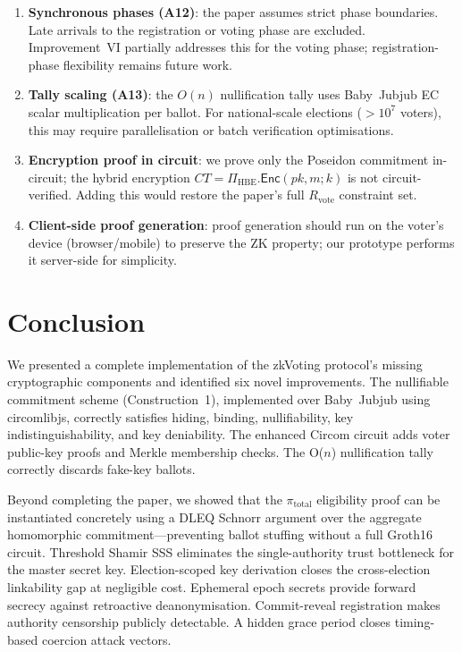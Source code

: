 \documentclass[conference]{IEEEtran}
\begin{document}
\begin{enumerate}
  \item \textbf{Synchronous phases (A12)}: the paper assumes strict phase
    boundaries.  Late arrivals to the registration or voting phase are
    excluded.  Improvement~VI partially addresses this for the voting phase;
    registration-phase flexibility remains future work.

  \item \textbf{Tally scaling (A13)}: the $O(n)$ nullification tally uses
    Baby~Jubjub EC scalar multiplication per ballot.  For national-scale
    elections ($> 10^7$ voters), this may require parallelisation or
    batch verification optimisations.

  \item \textbf{Encryption proof in circuit}: we prove only the Poseidon
    commitment in-circuit; the hybrid encryption $\mathit{CT} =
    \Pi_{\mathrm{HBE}}.\mathsf{Enc}(\mathit{pk}, m; k)$
    is not circuit-verified.  Adding this would restore the paper's full
    $R_{\text{vote}}$ constraint set.

  \item \textbf{Client-side proof generation}: proof generation should run
    on the voter's device (browser/mobile) to preserve the ZK property;
    our prototype performs it server-side for simplicity.
\end{enumerate}

\section{Conclusion}
\label{sec:conclusion}

We presented a complete implementation of the zkVoting protocol's missing
cryptographic components and identified six novel improvements.  The
nullifiable commitment scheme (Construction~1), implemented over Baby~Jubjub
using circomlibjs, correctly satisfies hiding, binding, nullifiability,
key indistinguishability, and key deniability.  The enhanced Circom circuit
adds voter public-key proofs and Merkle membership checks.  The O($n$)
nullification tally correctly discards fake-key ballots.

Beyond completing the paper, we showed that the $\pi_{\text{total}}$
eligibility proof can be instantiated concretely using a DLEQ Schnorr
argument over the aggregate homomorphic commitment---preventing ballot
stuffing without a full Groth16 circuit.  Threshold Shamir SSS eliminates
the single-authority trust bottleneck for the master secret key.  Election-scoped
key derivation closes the cross-election linkability gap at negligible cost.
Ephemeral epoch secrets provide forward secrecy against retroactive
deanonymisation.  Commit-reveal registration makes authority censorship
publicly detectable.  A hidden grace period closes timing-based coercion
attack vectors.
\end{document}
